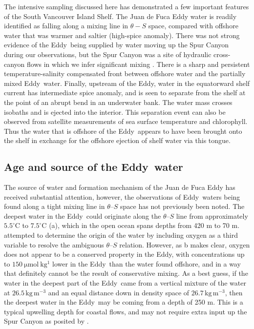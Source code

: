 \documentclass[draft]{agujournal2019}
\newcommand*{\Eddy}{{\sc Eddy}}
\providecommand{\DIFadd}[1]{{\protect\color{blue}\uwave{#1}}} %
\providecommand{\DIFaddbegin}{} %
\providecommand{\DIFaddend}{} %
\begin{document}
The intensive sampling discussed here has demonstrated a few important features of the South Vancouver Island Shelf.  The Juan de Fuca Eddy water is readily identified as falling along a mixing line in $\theta-S$ space, compared with offshore water that was warmer and saltier (high-spice anomaly).   There was not strong evidence of the \Eddy\ being supplied by water moving up the Spur Canyon during our observations, but the Spur Canyon was a site of hydraulic cross-canyon flows in which we infer significant mixing \DIFaddbegin \DIFadd{has occurred}\DIFaddend . There is a sharp and persistent temperature-salinity compensated front between offshore water and the partially mixed \Eddy\ water.  Finally, upstream of the \Eddy, water in the equatorward shelf current has intermediate spice anomaly, and is seen to separate from the shelf at the point of an abrupt bend in an underwater bank.  The water mass crosses isobaths and is ejected into the interior. This separation event can also be observed from satellite measurements of sea surface temperature and chlorophyll.  Thus the water that is offshore of the \Eddy\ appears to have been brought onto the shelf in exchange for the offshore ejection of shelf water via this tongue.

\subsection{Age and source of the \Eddy\ water}

The source of water and formation mechanism of the Juan de Fuca Eddy has received substantial attention, however, the observations of \Eddy\ waters being found along a tight mixing line in $\theta$--$S$ space has not previously been noted.  The deepest water in the \Eddy\ could originate along the $\theta$--$S$ line from approximately $5.5^\circ \mathrm{C}$ to $7.5^\circ \mathrm{C}$ (a), which in the open ocean spans depths from 420 m to 70 m.   attempted to determine the origin of the water by including oxygen as a third variable to resolve the ambiguous $\theta$--$S$ relation.  However, as b makes clear, oxygen does not appear to be a conserved property in the \Eddy, with concentrations up to $150 \ \mathrm{\mu mol\ kg^{1}}$ lower in the \Eddy\ than the water found offshore, and in a way that definitely cannot be the result of conservative mixing.  As a best guess, if the water in the deepest part of the \Eddy\ came from a vertical mixture of the water at $26.5\,\mathrm{kg\,m^{-3}}$ and an equal distance down in density space of $26.7\,\mathrm{kg\,m^{-3}}$, then the deepest water in the \Eddy\ may be coming from a depth of 250 m.  This is a typical upwelling depth for coastal flows, and may not require extra input up the Spur Canyon as posited by .
\end{document}
